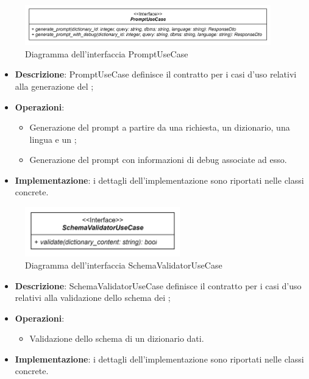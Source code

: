  \label{PromptUseCase}
\begin{figure}[H]
    \centering
    \includegraphics[width=0.95\textwidth]{assets/Backend/prompt_use_case.png}
    \caption{Diagramma dell'interfaccia PromptUseCase}
  \end{figure}
\begin{itemize}
    \item \textbf{Descrizione}: PromptUseCase definisce il contratto per i casi d'uso relativi alla generazione del ;
    \item \textbf{Operazioni}:
    \begin{itemize}
      \item Generazione del prompt a partire da una richiesta, un dizionario, una lingua e un ;
      \item Generazione del prompt con informazioni di debug associate ad esso.
    \end{itemize}
    \item \textbf{Implementazione}: i dettagli dell'implementazione sono riportati nelle classi concrete.
\end{itemize}  

 \label{SchemaValidatorUseCase}
\begin{figure}[H]
    \centering
    \includegraphics[width=0.6\textwidth]{assets/Backend/schema_validator_use_case.png}
    \caption{Diagramma dell'interfaccia SchemaValidatorUseCase}
  \end{figure}
\begin{itemize}
    \item \textbf{Descrizione}: SchemaValidatorUseCase definisce il contratto per i casi d'uso relativi alla validazione dello schema dei ;
    \item \textbf{Operazioni}:
    \begin{itemize}
      \item Validazione dello schema di un dizionario dati.
    \end{itemize}
    \item \textbf{Implementazione}: i dettagli dell'implementazione sono riportati nelle classi concrete.
\end{itemize}  

